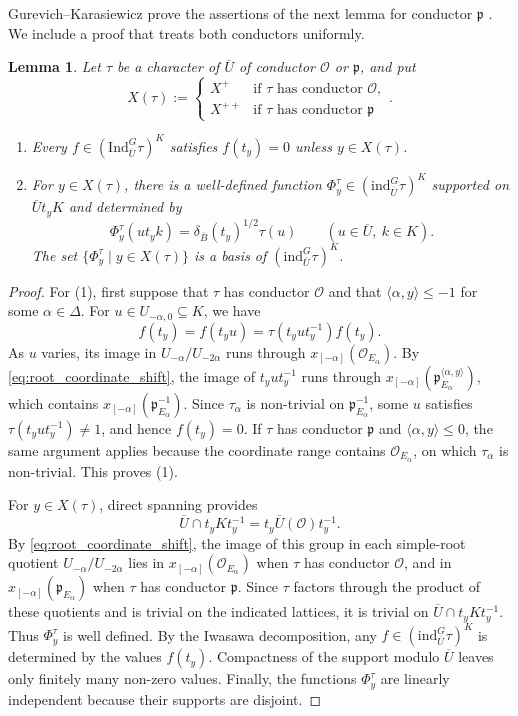 \documentclass[12pt]{article}
\numberwithin{equation}{section}
\newtheorem{lemma}[theorem]{Lemma}
\theoremstyle{definition}
\theoremstyle{remark}
\theoremstyle{plain}
\begin{document}
Gurevich--Karasiewicz prove the assertions of the next lemma for conductor $\mathfrak p$ \cite[Lemmas 5.1 and 5.2]{GK22}. We include a proof that treats both conductors uniformly.

\begin{lemma}\label{lem:whittaker_support}
Let $\tau$ be a character of $\overline U$ of conductor $\mathcal O$ or $\mathfrak p$, and put
$$X(\tau):=\begin{cases}X^+&\text{if $\tau$ has conductor $\mathcal O$},\\ X^{++}&\text{if $\tau$ has conductor $\mathfrak p$}\end{cases}.$$
\begin{enumerate}
\item Every $f\in(\mathrm{Ind}_{\overline U}^G\tau)^K$ satisfies $f(t_y)=0$ unless $y\in X(\tau)$.
\item For $y\in X(\tau)$, there is a well-defined function $\Phi^\tau_y\in(\mathrm{ind}_{\overline U}^G\tau)^K$ supported on $\overline U t_yK$ and determined by
$$\Phi^\tau_y(u t_yk)=\delta_{\overline B}(t_y)^{1/2}\tau(u)\qquad(u\in\overline U,\ k\in K).$$
The set $\{\Phi^\tau_y\mid y\in X(\tau)\}$ is a basis of $(\mathrm{ind}_{\overline U}^G\tau)^K$.
\end{enumerate}
\end{lemma}
\begin{proof}
For (1), first suppose that $\tau$ has conductor $\mathcal O$ and that $\langle\alpha,y\rangle\leq-1$ for some $\alpha\in\Delta$. For $u\in U_{-\alpha,0}\subseteq K$, we have
$$f(t_y)=f(t_yu)=\tau(t_yut_y^{-1})f(t_y).$$
As $u$ varies, its image in $U_{-\alpha}/U_{-2\alpha}$ runs through $x_{[-\alpha]}(\mathcal O_{E_\alpha})$. By \eqref{eq:root_coordinate_shift}, the image of $t_yut_y^{-1}$ runs through $x_{[-\alpha]}(\mathfrak p_{E_\alpha}^{\langle\alpha,y\rangle})$, which contains $x_{[-\alpha]}(\mathfrak p_{E_\alpha}^{-1})$. Since $\tau_\alpha$ is non-trivial on $\mathfrak p_{E_\alpha}^{-1}$, some $u$ satisfies $\tau(t_yut_y^{-1})\ne1$, and hence $f(t_y)=0$. If $\tau$ has conductor $\mathfrak p$ and $\langle\alpha,y\rangle\leq0$, the same argument applies because the coordinate range contains $\mathcal O_{E_\alpha}$, on which $\tau_\alpha$ is non-trivial. This proves (1).

For $y\in X(\tau)$, direct spanning provides
$$\overline U\cap t_yKt_y^{-1}=t_y\overline U(\mathcal O)t_y^{-1}.$$
By \eqref{eq:root_coordinate_shift}, the image of this group in each simple-root quotient $U_{-\alpha}/U_{-2\alpha}$ lies in $x_{[-\alpha]}(\mathcal O_{E_\alpha})$ when $\tau$ has conductor $\mathcal O$, and in $x_{[-\alpha]}(\mathfrak p_{E_\alpha})$ when $\tau$ has conductor $\mathfrak p$. Since $\tau$ factors through the product of these quotients and is trivial on the indicated lattices, it is trivial on $\overline U\cap t_yKt_y^{-1}$. Thus $\Phi^\tau_y$ is well defined. By the Iwasawa decomposition, any $f\in(\mathrm{ind}_{\overline U}^G\tau)^K$ is determined by the values $f(t_y)$. Compactness of the support modulo $\overline U$ leaves only finitely many non-zero values. Finally, the functions $\Phi^\tau_y$ are linearly independent because their supports are disjoint.
\end{proof}
\end{document}
